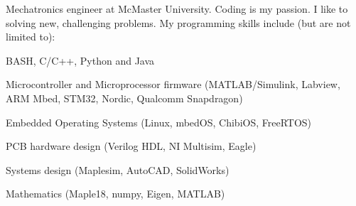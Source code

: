 
\begin{cvparagraph}

Mechatronics engineer at McMaster University. \newline
Coding is my passion. \newline
I like to solving new, challenging problems. \newline
My programming skills include (but are not limited to): \newline
\begin{cvitems}
  \item BASH, C/C++, Python and Java
  \item Microcontroller and Microprocessor firmware (MATLAB/Simulink, Labview, ARM Mbed, STM32, Nordic, Qualcomm Snapdragon)
  \item Embedded Operating Systems (Linux, mbedOS, ChibiOS, FreeRTOS)
  \item PCB hardware design (Verilog HDL, NI Multisim, Eagle)
  \item Systems design (Maplesim, AutoCAD, SolidWorks)
  \item Mathematics (Maple18, numpy, Eigen, MATLAB)
\end{cvitems}
\end{cvparagraph}

